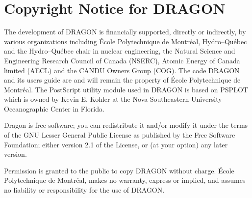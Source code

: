 \section*{Copyright Notice for DRAGON}

The development of DRAGON is financially supported, directly or indirectly, by various
organizations including \'{E}cole Polytechnique de Montr\'{e}al, Hydro--Qu\'{e}bec and the
Hydro--Qu\'{e}bec chair in nuclear engineering, the Natural Science and Engineering Research
Council of Canada (NSERC), Atomic Energy of Canada limited (AECL) and the CANDU Owners Group (COG).
The code DRAGON and its users guide are and will remain the property of
\'{E}cole Polytechnique de Montr\'{e}al. The PostScript utility module used in DRAGON is 
based on PSPLOT which is owned by Kevin E. Kohler at 
the Nova Southeastern University Oceanographic Center in Florida.

\vskip 0.15cm

Dragon is free software; you can redistribute it and/or
modify it under the terms of the GNU Lesser General Public
License as published by the Free Software Foundation; either
version 2.1 of the License, or (at your option) any later version.

\vskip 0.15cm

Permission is granted to the public to copy DRAGON without charge. \'{E}cole Polytechnique de
Montr\'{e}al, makes no warranty, express or implied, and assumes no liability or  responsibility
for the use of DRAGON.
